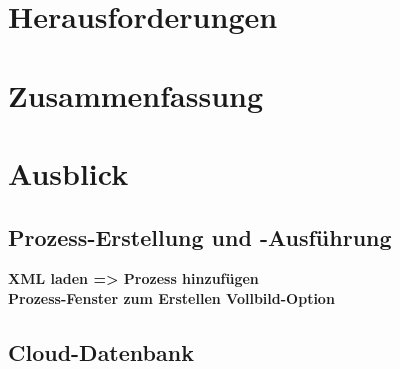 \section{Herausforderungen}

\section{Zusammenfassung}

\section{Ausblick}
\subsection{Prozess-Erstellung und -Ausführung}
\textbf{XML laden => Prozess hinzufügen}\\
\textbf{Prozess-Fenster zum Erstellen Vollbild-Option}
\subsection{Cloud-Datenbank}


\fi